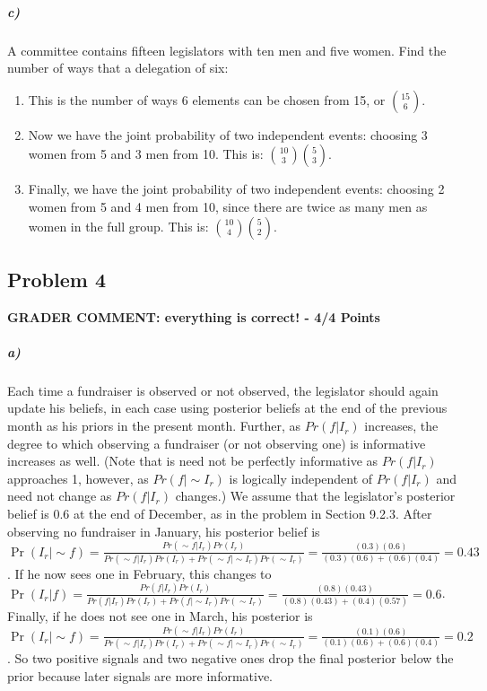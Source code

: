 \documentclass[12pt,letter]{article}\usepackage[]{graphicx}\usepackage[]{color}
\begin{document}
\subparagraph{c)} A committee contains fifteen legislators with ten men and five women. Find the number of ways that a delegation of six:
\begin{enumerate}
	\item This is the number of ways 6 elements can be chosen from 15, or ${15}\choose{6}$. %
	\item Now we have the joint probability of two independent events: choosing 3 women from 5 and 3 men from 10. This is: ${{10}\choose{3}} {{5}\choose{3}}$. %
	\item Finally, we have the joint probability of two independent events: choosing 2 women from 5 and 4 men from 10, since there are twice as many men as women in the full group. This is: ${{10}\choose{4}} {{5}\choose{2}}$. %
\end{enumerate}

\pagebreak

\subsection*{Problem 4}

\textbf{\color{red} GRADER COMMENT: everything is correct! - 4/4 Points}

\subparagraph{a)} Each time a fundraiser is observed or not observed, the legislator should again update his beliefs, in each case using posterior beliefs at the end of the previous month as his priors in the present month. Further, as $Pr(f|I_r)$ increases, the degree to which observing a fundraiser (or not observing one) is informative increases as well. (Note that is need not be perfectly informative as $Pr(f|I_r)$ approaches 1, however, as $Pr(f|\sim I_r)$ is logically independent of $Pr(f|I_r)$ and need not change as $Pr(f|I_r)$ changes.) We assume that the legislator's posterior belief is $0.6$ at the end of December, as in the problem in Section 9.2.3.  After observing no fundraiser in January, his posterior belief is $\Pr(I_r|\sim f)=\frac{Pr(\sim f|I_r)Pr(I_r)}{Pr(\sim f|I_r)Pr(I_r)+Pr(\sim f|\sim I_r)Pr(\sim I_r)}=\frac{(0.3)(0.6)}{(0.3)(0.6)+(0.6)(0.4)}=0.43$. If he now sees one in February, this changes to $\Pr(I_r|f)=\frac{Pr(f|I_r)Pr(I_r)}{Pr(f|I_r)Pr(I_r)+Pr(f|\sim I_r)Pr(\sim I_r)}=\frac{(0.8)(0.43)}{(0.8)(0.43)+(0.4)(0.57)}=0.6$. Finally, if he does not see one in March, his posterior is $\Pr(I_r|\sim f)=\frac{Pr(\sim f|I_r)Pr(I_r)}{Pr(\sim f|I_r)Pr(I_r)+Pr(\sim f|\sim I_r)Pr(\sim I_r)}=\frac{(0.1)(0.6)}{(0.1)(0.6)+(0.6)(0.4)}=0.2$. So two positive signals and two negative ones drop the final posterior below the prior because later signals are more informative.
\end{document}
